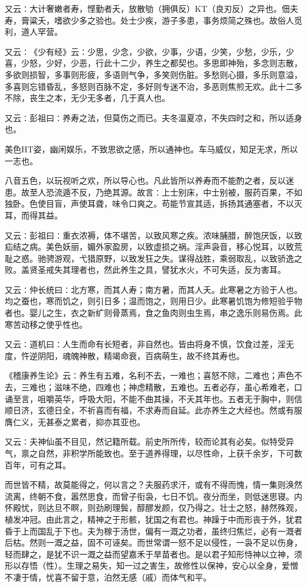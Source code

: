 \documentclass[a4paper,12pt,UTF8,twoside]{ctexbook}
\begin{document}
又云∶大计奢嫩者寿，悭勤者夭，放散劬（拥俱反）KT（良刃反）之异也。佃夫寿，膏粱夭，嗜欲少多之验也。处士少疾，游子多患，事务烦简之殊也。故俗人觅利，道人罕营。

又云∶《少有经》云∶少思，少念，少欲，少事，少语，少笑，少愁，少乐，少喜，少怒，少好，少恶，行此十二少，养生之都契也。多思即神殆，多念则志散，多欲则损智，多事则形疲，多语则气争，多笑则伤脏。多愁则心摄，多乐则意溢，多喜则忘错昏乱，多怒则百脉不定，多好则专迷不治，多恶则焦煎无欢。此十二多不除，丧生之本，无少无多者，几于真人也。

又云∶彭祖曰∶养寿之法，但莫伤之而已。夫冬温夏凉，不失四时之和，所以适身也。

美色HT姿，幽闲娱乐，不致思欲之感，所以通神也。车马威仪，知足无求，所以一志也。

八音五色，以玩视听之欢，所以导心也。凡此皆所以养寿而不能酌之者，反以迷患。故至人恐流遁不反，乃绝其源。故言∶上士别床，中士别被，服药百果，不如独卧。色使目盲，声使耳聋，味令口爽之。苟能节宣其适，拆扬其通塞者，不以灭耳，而得其益。

又云∶彭祖曰∶重衣浓褥，体不堪苦，以致风寒之疾。浓味脯腊，醉饱厌饭，以致疝结之病。美色妖丽，媚外家盈房，以致虚损之祸。淫声袅音，移心悦耳，以致荒耻之惑。驰骋游观，弋猎原野，以致发狂之失。谋得战胜，乘弱取乱，以致骄逸之败。盖贤圣戒失其理者也，然此养生之具，譬犹水火，不可失适，反为害耳。

又云∶仲长统曰∶北方寒，而其人寿；南方暑，而其人夭。此寒暑之方验于人也。均之蚕也，寒而饥之，则引日多；温而饱之，则用日少。此寒暑饥饱为修短验乎物者也。婴儿之生，衣之新纩则骨蒸焉，食之鱼肉则虫生焉，串之逸乐则易伤焉。此寒苦动移之使乎性也。

又云∶道机曰∶人生而命有长短者，非自然也。皆由将身不慎，饮食过差，淫无度，忤逆阴阳，魂魄神散，精竭命衰，百病萌生，故不终其寿也。

《稽康养生论》云∶养生有五难，名利不去，一难也；喜怒不除，二难也；声色不去，三难也；滋味不绝，四难也；神虑精散，五难也。五者必存，虽心希难老，口诵至言，咀嚼英华，呼吸大阳，不能不曲其操，不夭其年也。五者无于胸中，则信顺日济，玄德日全，不祈喜而有福，不求寿而自延。此亦养生之大经也。然或有服膺仁义，无甚泰之累者，抑亦其亚也。

又云∶夫神仙虽不目见，然记籍所载。前史所所传，较而论其有必矣。似特受异气，禀之自然，非积学所能致也。至于道养得理，以尽性命，上获千余岁，下可数百年，可有之耳。

而世皆不精，故莫能得之，何以言之？夫服药求汗，或有不得而愧，情一集则涣然流离，终朝不食，嚣然思食，而曾子衔袅，七日不饥。夜分而坐，则低迷思寝。内怀殿忧，则达旦不瞑，则劲刷理鬓，醇醪发颜，仅乃得之。壮士之怒，赫然殊观，植发冲冠。由此言之，精神之于形骸，犹国之有君也。神躁于中而形丧于外，犹君昏于上而国乱于下也。夫为稼于汤世，偏有一溉之功者，虽终归焦烂，必有一溉者后枯。然则一溉之益，固不可诬矣。而世常谓一怒不足以侵性，一袅不足以伤身，轻而肆之，是犹不识一溉之益而望嘉禾于旱苗者也。是以君子知形恃神以立神，须形以存悟（性）。生理之易失，知一过之害生，故修性以保神，安心以全身，爱憎不凄于情，忧喜不留于意，泊然无感（戚）而体气和平。
\end{document}
